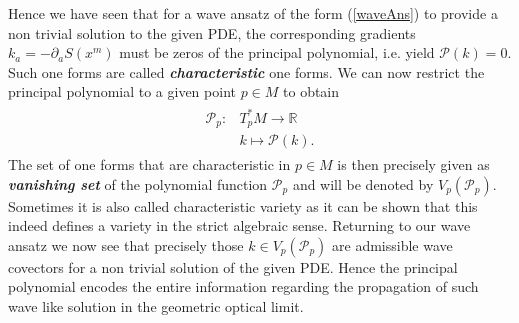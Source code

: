 \documentclass[a4paper,12pt, DIV=14, BCOR=5mm, twoside, headsepline]{scrbook}
\begin{document}
Hence we have seen that for a wave ansatz of the form (\ref{waveAns}) to provide a non trivial solution to the given PDE, the corresponding gradients $k_a = - \partial_aS(x^m)$ must be zeros of the principal polynomial, i.e. yield $\mathcal{P}(k) = 0$.
Such one forms are called \textit{\textbf{characteristic}} one forms. We can now restrict the principal polynomial to a given point $p \in M$ to obtain 
\begin{align}
    \begin{aligned}
    \mathcal{P}_p : &T^{\ast}_pM \longrightarrow \mathbb{R}\\
    &k \longmapsto \mathcal{P}(k).
    \end{aligned}
\end{align}
The set of one forms that are characteristic in $p \in M$ is then precisely given as \textbf{\textit{vanishing set}} of the polynomial function $\mathcal{P}_p$ and will be denoted by $V_p(\mathcal{P}_p)$. Sometimes it is also called characteristic variety as it can be shown that this indeed defines a variety in the strict algebraic sense. Returning to our wave ansatz we now see that precisely those $k \in V_p(\mathcal{P}_p)$ are admissible wave covectors for a non trivial solution of the given PDE. Hence the principal polynomial encodes the entire information regarding the propagation of such wave like solution in the geometric optical limit.\\ 
\end{document}
